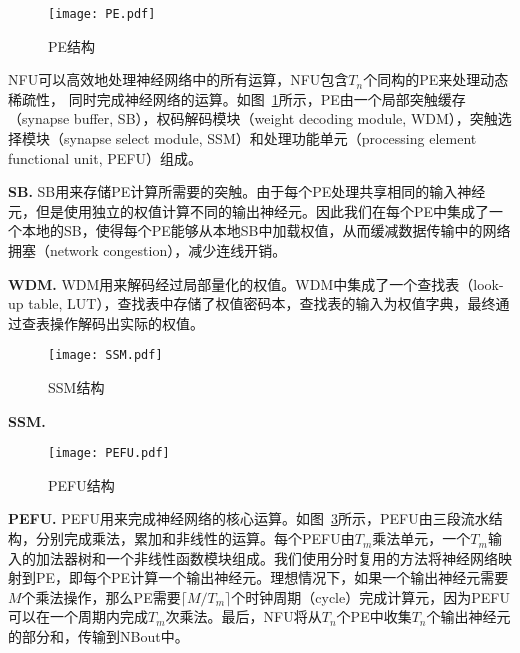 \begin{figure}[h]
\centering
\texttt{[image: PE.pdf]}
\caption{PE结构}
\label{fig:PE}
\end{figure}

NFU可以高效地处理神经网络中的所有运算，NFU包含$T_n$个同构的PE来处理动态稀疏性， 同时完成神经网络的运算。如图~\ref{fig:PE}所示，PE由一个局部突触缓存（synapse buffer, SB），权码解码模块（weight decoding module, WDM），突触选择模块（synapse select module, SSM）和处理功能单元（processing element functional unit, PEFU）组成。

\textbf{SB.} SB用来存储PE计算所需要的突触。由于每个PE处理共享相同的输入神经元，但是使用独立的权值计算不同的输出神经元。因此我们在每个PE中集成了一个本地的SB，使得每个PE能够从本地SB中加载权值，从而缓减数据传输中的网络拥塞（network congestion），减少连线开销。

\textbf{WDM.} WDM用来解码经过局部量化的权值。WDM中集成了一个查找表（look-up table, LUT），查找表中存储了权值密码本，查找表的输入为权值字典，最终通过查表操作解码出实际的权值。

\begin{figure}[h]
\centering
\texttt{[image: SSM.pdf]}
\caption{SSM结构}
\label{fig:SSM}
\end{figure}

\textbf{SSM.} 

\begin{figure}[h]
\centering
\texttt{[image: PEFU.pdf]}
\caption{PEFU结构}
\label{fig:PEFU}
\end{figure}

\textbf{PEFU.} PEFU用来完成神经网络的核心运算。如图~\ref{fig:PEFU}所示，PEFU由三段流水结构，分别完成乘法，累加和非线性的运算。每个PEFU由$T_m$乘法单元，一个$T_m$输入的加法器树和一个非线性函数模块组成。我们使用分时复用的方法将神经网络映射到PE，即每个PE计算一个输出神经元。理想情况下，如果一个输出神经元需要$M$个乘法操作，那么PE需要$\lceil M/T_{m} \rceil$个时钟周期（cycle）完成计算元，因为PEFU可以在一个周期内完成$T_m$次乘法。最后，NFU将从$T_n$个PE中收集$T_n$个输出神经元的部分和，传输到NBout中。 


